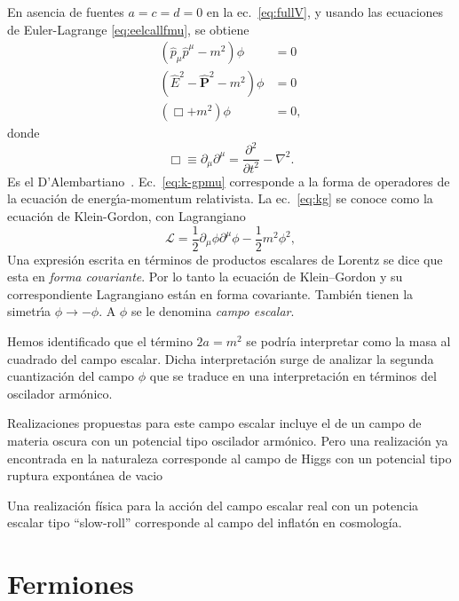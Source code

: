 En asencia de fuentes $a=c=d=0$ en la ec.~\eqref{eq:fullV}, y usando las
ecuaciones de Euler-Lagrange \eqref{eq:eelcallfmu}, se obtiene
\begin{align}
  (\hat{p}_\mu\hat{p}^\mu-m^2)\phi&=0\nonumber\\
  \label{eq:k-gpmu} %
(\hat{E}^2-\hat{\mathbf{P}}^2-m^2)\phi&=0\\
\label{eq:kg} 
  (\Box+m^2)\phi&=0,
\end{align}
donde
\begin{equation}
  \label{eq:dalambertiano}
  \Box\equiv\partial_\mu\partial^\mu=\frac{\partial^2}{\partial t^2}-\nabla^2. 
\end{equation}
Es el D'Alembartiano~\cite{daelembertiano}. 
Ec.~\eqref{eq:k-gpmu} %
corresponde a la forma de operadores de la
ecuaci\'on de energ\'\i a-momentum relativista. La
ec.~\eqref{eq:kg} se conoce como la ecuaci\'on de Klein-Gordon, con
Lagrangiano
\begin{equation}
  \label{eq:kglag}
  \mathcal{L}=\frac{1}{2}\partial_\mu\phi\partial^\mu\phi-\frac{1}{2}m^2\phi^2, 
\end{equation}
Una expresi\'on escrita en t\'erminos de productos escalares de
Lorentz se dice que esta en \emph{forma covariante}. Por lo tanto la
ecuaci\'on de Klein--Gordon y su correspondiente Lagrangiano est\'an
en forma covariante. Tambi\'en tienen la simetr\'\i a
$\phi\to-\phi$. A $\phi$ se le denomina \emph{campo escalar}.

Hemos identificado que el término $2a=m^2$ se podría interpretar como la masa al cuadrado del campo escalar. Dicha interpretación surge de analizar la segunda cuantización del campo $\phi$ que se traduce en una interpretación en términos del oscilador armónico.

Realizaciones propuestas para este campo escalar incluye el de un campo de materia oscura con un potencial tipo oscilador armónico.
Pero una realización ya encontrada en la naturaleza corresponde al campo de Higgs con un potencial tipo ruptura expontánea de vacio

Una realización física para la acción del campo escalar real con un potencia escalar tipo ``slow-roll''  corresponde al campo del inflatón en cosmología.



\chapter{Fermiones}
\label{cha:princ-gauge-local} %

